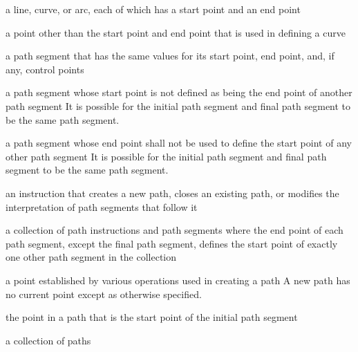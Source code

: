 
a line, \bezierlocal curve, or arc, each of which has a start point and an end point

a point other than the start point and end point that is used in defining a \bezierlocal curve

a path segment that has the same values for its start point, end point, and, if any, control points

a path segment whose start point is not defined as being the end point of another path segment
\enternote
It is possible for the initial path segment and final path segment to be the same path segment.
\exitnote

a path segment whose end point shall not be used to define the start point of any other path segment
\enternote
It is possible for the initial path segment and final path segment to be the same path segment.
\exitnote

an instruction that creates a new path, closes an existing path, or modifies the interpretation of path segments that follow it

a collection of path instructions and path segments where the end point of each path segment, except the final path segment, defines the start point of exactly one other path segment in the collection

a point established by various operations used in creating a path
\enternote
A new path has no current point except as otherwise specified.
\exitnote

the point in a path that is the start point of the initial path segment

a collection of paths

